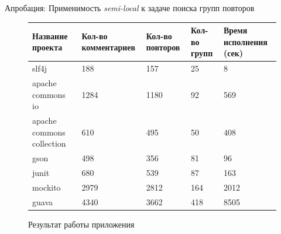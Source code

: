 \documentclass[xcolor=table]{beamer}
\begin{document}
    

\begin{frame}{Апробация: Применимость \emph{semi-local} к задаче поиска групп повторов}
    \begin{figure}
\begin{center}
 \begin{tabular}{ | p{2cm} | p{2cm} | p{2cm} | p{2cm} | p{2cm} |} 
 \hline
 
 Название  проекта & Кол-во  комментариев & Кол-во  повторов & Кол-во групп & Время исполнения (сек) \\
 \hline
  slf4j & 188 & 157 & 25 & 8 \\
  \hline
  apache commons io & 1284 & 1180 & 92 & 569 \\
  \hline
  apache commons collection & 610 &495 &50 & 408 \\
  \hline
  gson & 498 & 356 & 81 & 96 \\
  \hline junit & 680 & 539 & 87 & 163 \\
  \hline mockito & 2979 & 2812 & 164 & 2012\\
  \hline guava & 4340 & 3662 & 418 & 8505 \\
  \hline
\end{tabular}
\end{center}
\caption{Результат работы приложения}\label{table}
\end{figure}
\end{frame}
\end{document}
